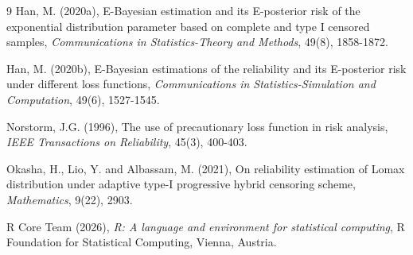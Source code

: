 \documentclass[twoside]{article}
\begin{document}
\begin{thebibliography}{9}
Han, M. (2020a), E-Bayesian estimation and its E-posterior risk of the exponential distribution parameter based on complete and type I censored samples, {\it Communications in Statistics-Theory and Methods}, {49}(8), 1858-1872.

Han, M. (2020b), E-Bayesian estimations of the reliability and its E-posterior risk under different loss functions, {\it Communications in Statistics-Simulation and Computation}, {49}(6), 1527-1545.


Norstorm, J.G. (1996), The use of precautionary loss function in risk analysis, {\it IEEE Transactions on Reliability}, 45(3), 400-403.

Okasha, H., Lio, Y. and Albassam, M. (2021), On reliability estimation of Lomax distribution under adaptive type-I progressive hybrid censoring scheme, {\it  Mathematics}, 9(22), 2903.

R Core Team (2026), {\it R: A language and environment for statistical computing}, R Foundation for Statistical Computing, Vienna, Austria.


   \end{thebibliography}
 
\end{document}
